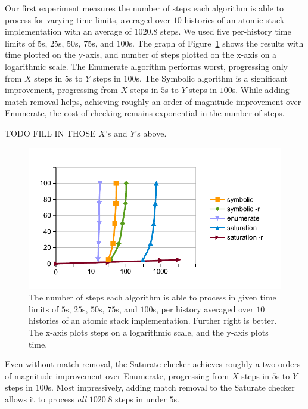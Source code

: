 Our first experiment measures the number of steps each algorithm is able to
process for varying time limits, averaged over $10$ histories of an atomic
stack implementation with an average of $1020.8$ steps. We used five
per-history time limits of $5$s, $25$s, $50$s, $75$s, and $100$s. The graph of
Figure~\ref{fig:steprace} shows the results with time plotted on the y-axis,
and number of steps plotted on the x-axis on a logarithmic scale. The {\sc
Enumerate} algorithm performs worst, progressing only from $X$ steps in $5$s to
$Y$ steps in $100$s. The {\sc Symbolic} algorithm is a significant improvement,
progressing from $X$ steps in $5$s to $Y$ steps in $100$s. While adding match
removal helps, achieving roughly an order-of-magnitude improvement over {\sc
Enumerate}, the cost of checking remains exponential in the number of steps.

TODO FILL IN THOSE $X$'s and $Y$'s above.

\begin{figure}[t]
  \centering
  \includegraphics[width=\linewidth]{figures/new_chart}
  \caption{The number of steps each algorithm is able to process in given time
  limits of $5$s, $25$s, $50$s, $75$s, and $100$s, per history averaged over
  $10$ histories of an atomic stack implementation. Further right is better.
  The x-axis plots steps on a logarithmic scale, and the y-axis plots time.}
  \label{fig:steprace}
\end{figure}

Even without match removal, the {\sc Saturate} checker achieves roughly a
two-orders-of-magnitude improvement over {\sc Enumerate}, progressing from $X$
steps in $5$s to $Y$ steps in $100$s. Most impressively, adding match removal
to the {\sc Saturate} checker allows it to process \emph{all} $1020.8$ steps in
under $5$s.

